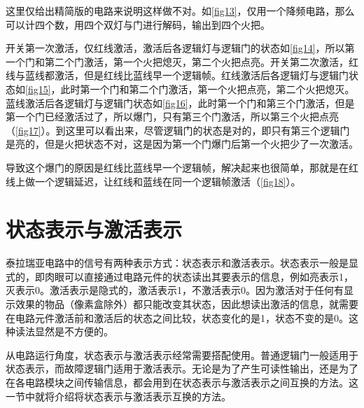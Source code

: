 \begin{figure}[!ht]
\qquad
{}
\end{figure}

这里仅给出精简版的电路来说明这样做不对。如\autoref{fig13}，仅用一个降频电路，那么可以计四个数，用四个双灯与门进行解码，输出到四个火把。

开关第一次激活，仅红线激活，激活后各逻辑灯与逻辑门的状态如\autoref{fig14}，所以第一个门和第二个门激活，第一个火把熄灭，第二个火把点亮。开关第二次激活，红线与蓝线都激活，但是红线比蓝线早一个逻辑帧。红线激活后各逻辑灯与逻辑门状态如\autoref{fig15}，此时第一个门和第二个门激活，第一个火把点亮，第二个火把熄灭。蓝线激活后各逻辑灯与逻辑门状态如\autoref{fig16}，此时第一个门和第三个门激活，但是第一个门已经激活过了，所以爆门，只有第三个门激活，所以第三个火把点亮（\autoref{fig17}）。到这里可以看出来，尽管逻辑门的状态是对的，即只有第三个逻辑门是亮的，但是火把状态不对，这是因为第一个门爆门后第一个火把少了一次激活。

导致这个爆门的原因是红线比蓝线早一个逻辑帧，解决起来也很简单，那就是在红线上做一个逻辑延迟，让红线和蓝线在同一个逻辑帧激活（\autoref{fig18}）。

\section{状态表示与激活表示}

泰拉瑞亚电路中的信号有两种表示方式：状态表示和激活表示。状态表示一般是显式的，即肉眼可以直接通过电路元件的状态读出其要表示的信息，例如亮表示1，灭表示0。激活表示是隐式的，激活表示1，不激活表示0。因为激活对于任何有显示效果的物品（像素盒除外）都只能改变其状态，因此想读出激活的信息，就需要在电路元件激活前和激活后的状态之间比较，状态变化的是1，状态不变的是0。这种读法显然是不方便的。

从电路运行角度，状态表示与激活表示经常需要搭配使用。普通逻辑门一般适用于状态表示，而故障逻辑门适用于激活表示。无论是为了产生可读性输出，还是为了在各电路模块之间传输信息，都会用到在状态表示与激活表示之间互换的方法。这一节中就将介绍将状态表示与激活表示互换的方法。

